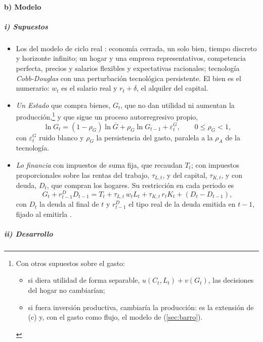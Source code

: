 \documentclass[11pt]{article}
\begin{document}
\paragraph{b) Modelo}

\subparagraph{i) Supuestos}

\begin{itemize}
\item Los del modelo de ciclo real : economía cerrada, un solo bien, tiempo discreto y horizonte infinito; un hogar y una empresa representativos, competencia perfecta, precios y salarios flexibles y expectativas racionales; tecnología \emph{Cobb-Douglas} con una perturbación tecnológica persistente. El bien es el numerario: $w_t$ es el salario real y $r_t+\delta$, el alquiler del capital.
\item \emph{Un Estado} que compra bienes, $G_t$, que no dan utilidad ni aumentan la producción,\footnote{Con otros supuestos sobre el gasto:
\begin{itemize}
\item si diera utilidad de forma separable, $u(C_t,L_t)+v(G_t)$, las decisiones del hogar no cambiarían;
\item si fuera inversión productiva, cambiaría la producción: es la extensión de \textcite{BaxterKing1993Fiscal} (c) y, con el gasto como flujo, el modelo de \textcite{Barro1990} (\ref{sec:barro}).\end{itemize}} y que sigue un proceso autorregresivo propio,
  \begin{equation}\label{eq:rbc-gasto}
  \ln G_t=(1-\rho_G)\ln\overline{G}+\rho_G\ln G_{t-1}+\varepsilon^G_t,\qquad 0\le\rho_G<1,
  \end{equation}
  con $\varepsilon^G_t$ ruido blanco y $\rho_G$ la persistencia del gasto, paralela a la $\rho_A$ de la tecnología.
\item \emph{Lo financia} con impuestos de suma fija, que recaudan $T_t$; con impuestos proporcionales sobre las rentas del trabajo, $\tau_{L,t}$, y del capital, $\tau_{K,t}$, y con deuda, $D_t$, que compran los hogares. Su restricción en cada periodo es
  \begin{equation}\label{eq:rbc-gobierno}
  G_t+r^D_{t-1}D_{t-1}=T_t+\tau_{L,t}\,w_tL_t+\tau_{K,t}\,r_tK_t+(D_t-D_{t-1}),
  \end{equation}
  con $D_t$ la deuda al final de $t$ y $r^D_{t-1}$ el tipo real de la deuda emitida en $t-1$, fijado al emitirla .
\end{itemize}

\subparagraph{ii) Desarrollo}
\end{document}
